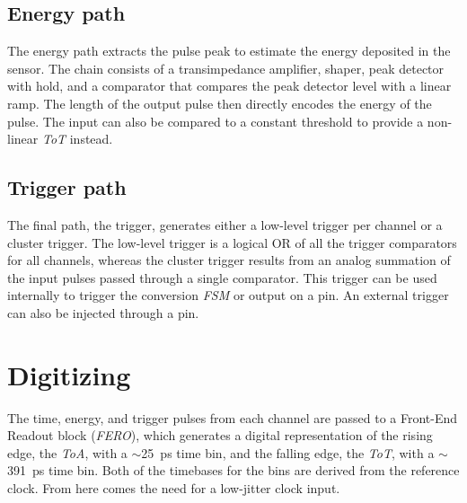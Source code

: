 \subsection{Energy path}
The energy path extracts the pulse peak to estimate the energy deposited in the sensor. The chain consists of a transimpedance amplifier, shaper, peak detector with hold, and a comparator that compares the peak detector level with a linear ramp. The length of the output pulse then directly encodes the energy of the pulse. The input can also be compared to a constant threshold to provide a non-linear \emph{ToT} instead. \cite{ficDatasheet}

\subsection{Trigger path}
The final path, the trigger, generates either a low-level trigger per channel or a cluster trigger. The low-level trigger is a logical OR of all the trigger comparators for all channels, whereas the cluster trigger results from an analog summation of the input pulses passed through a single comparator. This trigger can be used internally to trigger the conversion \emph{FSM} or output on a pin. An external trigger can also be injected through a pin. \cite{ficDatasheet}



\section{Digitizing}
\label{sec:fastic_digitizing}
The time, energy, and trigger pulses from each channel are passed to a Front-End Readout block (\emph{FERO}), which generates a digital representation of the rising edge, the \emph{ToA}, with a $\sim$\SI{25}{\pico\second} time bin, and the falling edge, the \emph{ToT}, with a $\sim$\SI{391}{\pico\second} time bin. Both of the timebases for the bins are derived from the reference clock. From here comes the need for a low-jitter clock input.\cite{ficDatasheet}

